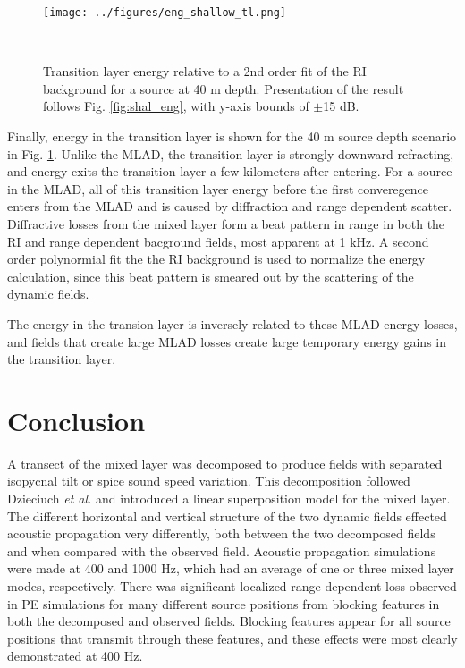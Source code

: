 \documentclass[preprint,NumberedRefs]{JASA}
\begin{document}
\begin{figure}
\texttt{[image: ../figures/eng\_shallow\_tl.png]}
    \caption{Transition layer energy relative to a 2nd order fit of the RI background for a source at 40 m depth. Presentation of the result follows Fig. \ref{fig:shal_eng}, with y-axis bounds of $\pm$15 dB.}
    \label{fig:eng_tl}
\end{figure}

Finally, energy in the transition layer is shown for the 40 m source depth scenario in Fig. \ref{fig:eng_tl}. Unlike the MLAD, the transition layer is strongly downward refracting, and energy exits the transition layer a few kilometers after entering. For a source in the MLAD, all of this transition layer energy before the first converegence enters from the MLAD and is caused by diffraction and range dependent scatter. Diffractive losses from the mixed layer form a beat pattern in range in both the RI and range dependent bacground fields, most apparent at 1 kHz. A second order polynormial fit the the RI background is used to normalize the energy calculation, since this beat pattern is smeared out by the scattering of the dynamic fields.

The energy in the transion layer is inversely related to these MLAD energy losses, and fields that create large MLAD losses create large temporary energy gains in the transition layer.

\section{Conclusion}\label{sec:conclusion}
A transect of the mixed layer was decomposed to produce fields with separated isopycnal tilt or spice sound speed variation. This decomposition followed Dzieciuch \emph{et al.}\citep{dzieciuch2004} and introduced a linear superposition model for the mixed layer. The different horizontal and vertical structure of the two dynamic fields effected acoustic propagation very differently, both between the two decomposed fields and when compared with the observed field. Acoustic propagation simulations were made at 400 and 1000 Hz, which had an average of one or three mixed layer modes, respectively. There was significant localized range dependent loss observed in PE simulations for many different source positions from blocking features in both the decomposed and observed fields. Blocking features appear for all source positions that transmit through these features, and these effects were most clearly demonstrated at 400 Hz.
\end{document}
